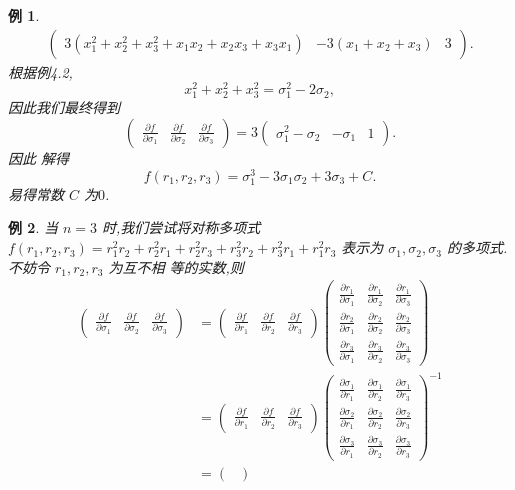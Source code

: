 \documentclass[a4paper]{article}
\newtheorem{example}{例}[section]
\newcommand{\pa}{\partial} \newcommand{\Om}{\Omega}
\begin{document}
\begin{example}
\begin{align*}
\begin{pmatrix}
    3(x_1^2+x_2^2+x_3^2+x_1x_2+x_2x_3+x_3x_1)&-3(x_1+x_2+x_3)&3
  \end{pmatrix}.
\end{align*}
根据例4.2,
$$
x_1^2+x_2^2+x_3^2=\sigma_1^2-2\sigma_2,
$$
因此我们最终得到
$$
\begin{pmatrix}
  \frac{\pa f}{\pa \sigma_1}&\frac{\pa f}{\pa \sigma_2}&\frac{\pa
    f}{\pa \sigma_3}
\end{pmatrix}=3\begin{pmatrix} \sigma_1^2-\sigma_2&-\sigma_1&1
\end{pmatrix}.
$$
因此
解得
$$
f(r_1,r_2,r_3)=\sigma_1^3-3\sigma_1\sigma_2+3\sigma_3+C.
$$
易得常数 $C$ 为$0$.
\end{example}
\begin{example}
  当 $n=3$ 时,我们尝试将对称多项式
  $f(r_1,r_2,r_3)=r_1^2r_2+r_{2}^{2}r_{1}+r_2^2r_3+r_{3}^{2}r_{2}+r_3^2r_1+r_1^2r_3$ 表示为
  $\sigma_1,\sigma_2,\sigma_3$ 的多项式.不妨令 $r_1,r_2,r_3$ 为互不相
  等的实数,则
\begin{align*}
  \begin{pmatrix}
    \frac{\pa f}{\pa \sigma_1}&\frac{\pa f}{\pa \sigma_2}&\frac{\pa
      f}{\pa \sigma_3}
  \end{pmatrix}&=\begin{pmatrix} \frac{\pa f}{\pa r_1}&\frac{\pa
      f}{\pa r_2}&\frac{\pa f}{\pa r_3}
  \end{pmatrix}\begin{pmatrix}
    \frac{\pa r_1}{\pa \sigma_1}&\frac{\pa r_1}{\pa
      \sigma_2}&\frac{\pa
      r_1}{\pa \sigma_3}\\
    \frac{\pa r_2}{\pa \sigma_1}&\frac{\pa r_2}{\pa
      \sigma_2}&\frac{\pa
      r_2}{\pa \sigma_3}\\
    \frac{\pa r_3}{\pa \sigma_1}&\frac{\pa r_3}{\pa
      \sigma_2}&\frac{\pa r_3}{\pa \sigma_3}
  \end{pmatrix}\\&=\begin{pmatrix}
    \frac{\pa f}{\pa r_1}&\frac{\pa f}{\pa r_2}&\frac{\pa f}{\pa r_3}
  \end{pmatrix}\begin{pmatrix}
    \frac{\pa \sigma_1}{\pa r_1}&\frac{\pa \sigma_1}{\pa
      r_2}&\frac{\pa \sigma_1}{\pa r_3}\\
\frac{\pa \sigma_2}{\pa r_1}&\frac{\pa \sigma_2}{\pa r_2}&\frac{\pa
  \sigma_2}{\pa r_3}\\
\frac{\pa\sigma_3}{\pa r_1}&\frac{\pa \sigma_3}{\pa r_2}&\frac{\pa
  \sigma_3}{\pa r_3}
  \end{pmatrix}^{-1}\\&=\begin{pmatrix}

\end{pmatrix}
\end{align*}
\end{example}
\end{document}
